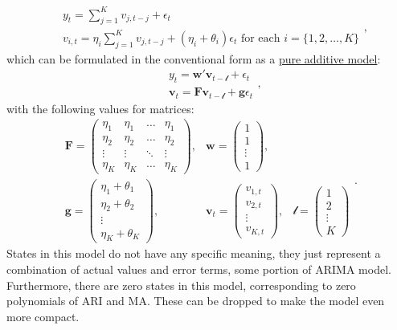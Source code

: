 \documentclass[
]{book}
\theoremstyle{definition}
\theoremstyle{definition}
\theoremstyle{definition}
\theoremstyle{definition}
\theoremstyle{remark}
\begin{document}
\begin{equation}
  \begin{aligned}
    &{y}_{t} = \sum_{j=1}^K v_{j,t-j} + \epsilon_t \\
    &v_{i,t} = \eta_i \sum_{j=1}^K v_{j,t-j} + (\eta_i + \theta_i) \epsilon_{t} \text{ for each } i=\{1, 2, \dots, K \}
  \end{aligned},
  \label{eq:ADAMARIMAExpanded}
\end{equation}
which can be formulated in the conventional form as a \protect\hyperlink{ADAMETSPureAdditive}{pure additive model}:
\begin{equation*}
  \begin{aligned}
    &{y}_{t} = \mathbf{w}' \mathbf{v}_{t-\boldsymbol{\mathscr{l}}} + \epsilon_t \\
    &\mathbf{v}_{t} = \mathbf{F} \mathbf{v}_{t-\boldsymbol{\mathscr{l}}} + \mathbf{g} \epsilon_t
  \end{aligned},
\end{equation*}
with the following values for matrices:
\begin{equation}
  \begin{aligned}
    \mathbf{F} = \begin{pmatrix} \eta_1 & \eta_1 & \dots & \eta_1 \\ \eta_2 & \eta_2 & \dots & \eta_2 \\ \vdots & \vdots & \ddots & \vdots \\ \eta_K & \eta_K & \dots & \eta_K \end{pmatrix}, & \mathbf{w} = \begin{pmatrix} 1 \\ 1 \\ \vdots \\ 1 \end{pmatrix}, \\
    \mathbf{g} = \begin{pmatrix} \eta_1 + \theta_1 \\ \eta_2 + \theta_2 \\ \vdots \\ \eta_K + \theta_K \end{pmatrix}, & \mathbf{v}_{t} = \begin{pmatrix} v_{1,t} \\ v_{2,t} \\ \vdots \\ v_{K,t} \end{pmatrix}, & \boldsymbol{\mathscr{l}} = \begin{pmatrix} 1 \\ 2 \\ \vdots \\ K \end{pmatrix}
  \end{aligned}.
  \label{eq:ADAMARIMAMatrices}
\end{equation}
States in this model do not have any specific meaning, they just represent a combination of actual values and error terms, some portion of ARIMA model. Furthermore, there are zero states in this model, corresponding to zero polynomials of ARI and MA. These can be dropped to make the model even more compact.
\end{document}
